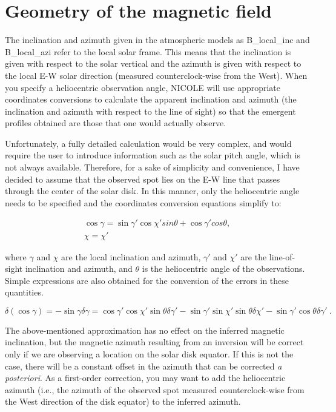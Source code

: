 \chapter{Geometry of the magnetic field}

The inclination and azimuth given in the atmospheric models as
B\_local\_inc and B\_local\_azi refer to the local solar frame.  This
means that the inclination is given with respect to the solar vertical
and the azimuth is given with respect to the local E-W solar
direction (measured counterclock-wise from the West). When you specify
a heliocentric observation angle, NICOLE will use appropriate
coordinates conversions to calculate the apparent inclination and
azimuth (the inclination and azimuth with respect to the line of
sight) so that the emergent profiles obtained are those that one would
actually observe.

Unfortunately, a fully detailed calculation would be very complex, and
would require the user to introduce information such as the solar
pitch angle, which is not always available.  Therefore, for a sake of
simplicity and convenience, I have decided to assume that the observed
spot lies on the E-W line that passes through the center of the solar
disk. In this manner, only the heliocentric angle needs to be
specified and the coordinates conversion equations simplify to:

\begin{eqnarray}
\cos \gamma = \sin \gamma' \cos \chi' sin \theta + \cos\gamma' cos \theta, \\
\chi = \chi'
\end{eqnarray}

where $\gamma$ and $\chi$ are the local inclination and azimuth, 
$\gamma'$  and $\chi'$ are the line-of-sight inclination
and azimuth, and $\theta$ is the heliocentric angle of the 
observations. Simple expressions are also obtained for the 
conversion of the errors in these quantities.

\begin{equation}
\delta (\cos \gamma) = -\sin\gamma\delta\gamma =
\cos \gamma' \cos\chi' \sin\theta\delta\gamma'- 
\sin\gamma' \sin\chi' \sin\theta\delta\chi'- 
\sin\gamma' \cos \theta \delta\gamma'~.
\end{equation}

The above-mentioned approximation has no effect on the inferred magnetic 
inclination, but the magnetic azimuth resulting from an inversion will be 
correct only if we are observing a location on the solar disk equator. 
If this is not the case, there will be a constant offset in the
azimuth that can be corrected {\it a posteriori}. 
As a first-order correction, you may want to add
the heliocentric azimuth (i.e., the azimuth of the observed spot 
measured counterclock-wise from the West direction of the disk equator) 
to the inferred azimuth.



